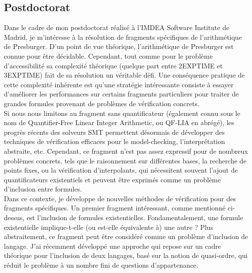 \subsection*{Postdoctorat}
\vspace{10pt}

Dans le cadre de mon postdoctorat réalisé à l'IMDEA Software Institute de
Madrid, je m'intéresse à la résolution de fragments spécifiques de
l'arithmétique de Presburger. D'un point de vue théorique, l'arithmétique de
Presburger est connue pour être décidable. Cependant, tout comme pour le
problème d'accessibilité sa complexité théorique (quelque part entre 2EXPTIME et
3EXPTIME) fait de sa résolution un véritable défi. Une conséquence pratique de
cette \og complexité inhérente \fg est qu'une stratégie intéressante consiste à
essayer d'améliorer les performances sur certains fragments particuliers pour
traiter de grandes formules provenant de problèmes de vérification concrets.\\

Si nous nous limitons au fragment sans quantificateur (également connu sous le
nom de Quantifier-Free Linear Integer Arithmetic, ou QF-LIA en abrégé), les
progrès récents des solveurs SMT permettent désormais de développer des
techniques de vérification efficaces pour le model-checking, l'interprétation
abstraite, etc. Cependant, ce fragment n'est pas assez expressif pour de
nombreux problèmes concrets, tels que le raisonnement sur différentes bases, la
recherche de points fixes, ou la vérification d'interpolants, qui nécessitent
souvent l'ajout de quantificateurs existentiels et peuvent être exprimés comme un
problème d'inclusion entre formules.\\

Dans ce contexte, je développe de nouvelles méthodes de vérification pour
des fragments spécifiques. Un premier fragment intéressant, comme mentionné
ci-dessus, est l'inclusion de formules existentielles. Fondamentalement,
une formule existentielle implique-t-elle (ou est-elle équivalente à) une autre
? Plus abstraitement, ce fragment peut être considéré comme un problème
d'inclusion de langage.  J'ai récemment développé une approche qui repose sur
un cadre théorique pour l'inclusion de deux langages, basé sur la notion de
quasi-ordre, qui réduit le problème à un nombre fini de questions
d'appartenance. 

